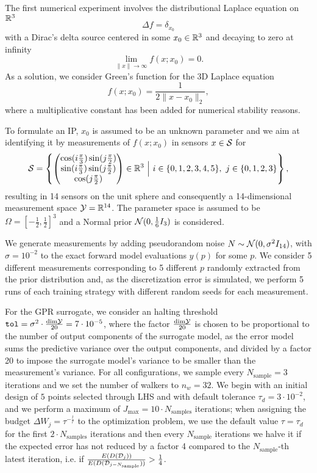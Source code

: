 The first numerical experiment involves the distributional Laplace equation on $\mathbb{R}^3$
\[
 \Delta f = \delta_{x_0}
\] 
with a Dirac's delta source centered in some $x_0 \in \mathbb{R}^3$ and decaying to zero at infinity
\[
\lim_{\| x \| \to \infty} f(x; x_0) = 0.
\]
As a solution, we consider Green's function for the 3D Laplace equation
\[
f(x; x_0) =  \frac{1}{2 \|x-x_0\|_2},
\]
where a multiplicative constant has been added for numerical stability reasons. \medskip

To formulate an IP, $x_0$ is assumed to be an unknown parameter and we aim at identifying it by measurements of $f(x;x_0)$ in sensors $x \in \mathcal S$ for 
\[
    \mathcal S = \left\{
        \begin{pmatrix}
            \cos( i \frac{\pi}{3}) \sin( j \frac{\pi}{2}) \\
            \sin( i \frac{\pi}{3}) \sin( j \frac{\pi}{2}) \\ 
            \cos( j \frac{\pi}{2})
        \end{pmatrix} 
        \in \mathbb{R}^3 \ \Big| \ i \in \{0,1,2,3,4,5\}, \ j \in \{0,1,2,3\}
     \right\},
\]
resulting in 14 sensors on the unit sphere and consequently a 14-dimensional measurement space $\mathcal Y = \mathbb{R}^{14}$. \newline
The parameter space is assumed to be $\Omega = \left[-\frac{1}{2}, \frac{1}{2}\right]^3$ and a Normal prior $\mathcal N (0, \frac{1}{6}I_3)$ is considered.

We generate measurements by adding pseudorandom noise $N \sim \mathcal N (0, \sigma^2 I_{14})$, with $\sigma = 10^{-2}$ to the exact forward model evaluations $y(p)$ for some $p$. 
We consider 5 different measurements corresponding to 5 different $p$ randomly extracted from the prior distribution and, as the discretization error is simulated, we perform 5 runs of each training strategy with different random seeds for each measurement.
\medskip

For the GPR surrogate, we consider an halting threshold $\texttt{tol} = \sigma^2 \cdot \frac{\text{dim} \mathcal Y }{20} = 7\cdot 10^{-5}$, where the factor $\frac{\text{dim} \mathcal Y}{20}$ is chosen to be proportional to the number of output components of the surrogate model, as the error model sums the predictive variance over the output components, and divided by a factor 20 to impose the surrogate model's variance to be smaller than the measurement's variance.
For all configurations, we sample every $N_{\text{sample}} = 3$ iterations and we set the number of walkers to $n_w = 32$.
We begin with an initial design of $5$ points selected through LHS and with default tolerance $\tau_d = 3 \cdot 10^{-2}$, and we perform a maximum of $J_{\max} = 10 \cdot N_{\text{samples}}$ iterations; when assigning the budget $\Delta W_j = \tau ^{-\frac{l}{r}}$ to the optimization problem, we use the default value $\tau= \tau_d$ for the first $2\cdot N_{\text{samples}}$ iterations and then every $N_{\text{sample}}$ iterations we halve it if the expected error has not reduced by a factor 4 compared to the $N_{\text{sample}}$-th latest iteration, i.e. if $\frac{E(D(\mathcal D_j))}{E(D(\mathcal D_{j-N_{\text{sample}}}))} > \frac{1}{4}$.

